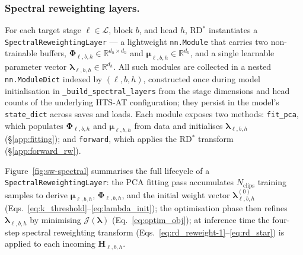 \subsubsection{Spectral reweighting layers.}
For each target stage $\ell \in \mathcal{L}$, block $b$, and head $h$,
RD$^*$\xspace instantiates a \texttt{SpectralReweightingLayer} — a lightweight
\texttt{nn.Module} that carries two non-trainable buffers,
$\boldsymbol{\Phi}_{\ell,b,h} \in \mathbb{R}^{d_h \times d_h}$ and
$\boldsymbol{\mu}_{\ell,b,h} \in \mathbb{R}^{d_h}$, and a single
learnable parameter vector
$\boldsymbol{\lambda}_{\ell,b,h} \in \mathbb{R}^{d_h}$.
All such modules are collected in a nested \texttt{nn.ModuleDict}
indexed by $(\ell, b, h)$, constructed once during model initialisation
in \texttt{\_build\_spectral\_layers} from the stage dimensions and head
counts of the underlying HTS-AT configuration; they persist in the
model's \texttt{state\_dict} across saves and loads.
Each module exposes two methods: \texttt{fit\_pca}, which populates
$\boldsymbol{\Phi}_{\ell,b,h}$ and $\boldsymbol{\mu}_{\ell,b,h}$ from
data and initialises $\boldsymbol{\lambda}_{\ell,b,h}$
(\S\ref{app:fitting}); and \texttt{forward}, which applies the
RD$^*$\xspace transform (\S\ref{app:forward_rw}).

Figure~\ref{fig:sw-spectral} summarises the full lifecycle of a
\texttt{SpectralReweightingLayer}: the PCA fitting pass accumulates
$N_{\mathrm{clips}}$ training samples to derive
$\boldsymbol{\mu}_{\ell,b,h}$, $\boldsymbol{\Phi}_{\ell,b,h}$, and the
initial weight vector $\boldsymbol{\lambda}^{(0)}_{\ell,b,h}$
(Eqs.~\eqref{eq:k_threshold}--\eqref{eq:lambda_init}); the optimisation
phase then refines $\boldsymbol{\lambda}_{\ell,b,h}$ by minimising
$\mathcal{J}(\boldsymbol{\lambda})$ (Eq.~\eqref{eq:optim_obj}); at
inference time the four-step spectral reweighting transform
(Eqs.~\eqref{eq:rd_reweight-1}--\eqref{eq:rd_star}) is applied to each
incoming $\mathbf{H}_{\ell,b,h}$.

